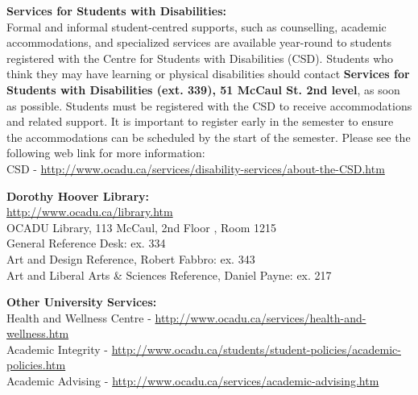 \documentclass[10pt]{article}
\begin{document}
\textbf{Services for Students with Disabilities:}\\
Formal and informal student-centred supports, such as counselling, academic accommodations, and specialized services are available year-round to students registered with the Centre for Students with Disabilities (CSD). Students who think they may have learning or physical disabilities should contact \textbf{Services for Students with Disabilities (ext. 339), 51 McCaul St. 2nd level}, as soon as possible. Students must be registered with the CSD to receive accommodations and related support. It is important to register early in the semester to ensure the accommodations can be scheduled by the start of the semester.  Please see the following web link for more information:\\ CSD - \url{http://www.ocadu.ca/services/disability-services/about-the-CSD.htm} 

\textbf{Dorothy Hoover Library:}\\
\url{http://www.ocadu.ca/library.htm} \\
OCADU Library, 113 McCaul, 2nd Floor , Room 1215 \\
General Reference Desk: ex. 334 \\
Art and Design Reference, Robert Fabbro: ex. 343 \\
Art and Liberal Arts \& Sciences Reference, Daniel Payne: ex. 217 

\textbf{Other University Services:}\\
Health and Wellness Centre - \url{http://www.ocadu.ca/services/health-and-wellness.htm} \\
Academic Integrity - \url{http://www.ocadu.ca/students/student-policies/academic-policies.htm} \\
Academic Advising - \url{http://www.ocadu.ca/services/academic-advising.htm} 
\end{document}
